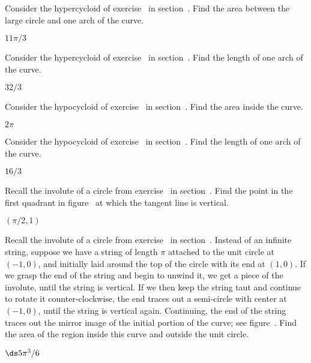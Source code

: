\begin{exercises}
\begin{exercise} Consider the hypercycloid of 
exercise~ in 
section~. Find the area between the
large circle and
one arch of the curve.
\begin{answer} $11\pi/3$
\end{answer}\end{exercise}

\begin{exercise} Consider the hypercycloid of
exercise~ in section~. Find the length of one arch of the curve.  
\begin{answer} $32/3$
\end{answer}\end{exercise}

\begin{exercise} Consider the hypocycloid of 
exercise~ in 
section~. Find the area inside the curve.
\begin{answer} $2\pi$
\end{answer}\end{exercise}

\begin{exercise} Consider the hypocycloid of
exercise~ in section~. Find the length of one arch of the curve.  
\begin{answer} $16/3$
\end{answer}\end{exercise}

\begin{exercise} Recall the involute of a circle from
exercise~ in
section~. Find the point in the first
quadrant in figure~ 
at which the tangent line is vertical.
\begin{answer} $(\pi/2,1)$
\end{answer}\end{exercise}

\begin{exercise} Recall the involute of a circle from
exercise~ in
section~. Instead of an infinite
string, suppose we have a string of length $\pi$ attached to the unit
circle at $(-1,0)$, and initially laid around the top of the circle
with its end at $(1,0)$. If we grasp the end of the string and begin
to unwind it, we get a piece of the involute, until the string is
vertical. If we then keep the string taut and continue to rotate it
counter-clockwise, the end traces out a semi-circle with center at
$(-1,0)$, until the string is vertical again. Continuing, the end of
the string traces out the mirror image of the initial portion of the
curve; see figure~. Find the area
of the region inside this curve and outside the unit circle.
\begin{answer} $\ds 5\pi^3/6$
\end{answer}\end{exercise}


\end{exercises}
